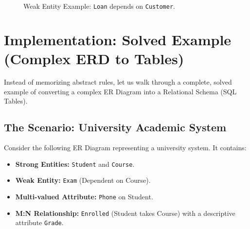 \documentclass[12pt,a4paper]{article}
\begin{document}
\begin{figure}[H]
    \centering
    \caption{Weak Entity Example: \texttt{Loan} depends on \texttt{Customer}.}
\end{figure}



\newpage
\section{Implementation: Solved Example (Complex ERD to Tables)}

Instead of memorizing abstract rules, let us walk through a complete, solved example of converting a complex ER Diagram into a Relational Schema (SQL Tables).

\subsection{The Scenario: University Academic System}
Consider the following ER Diagram representing a university system. It contains:
\begin{itemize}
    \item \textbf{Strong Entities:} \texttt{Student} and \texttt{Course}.
    \item \textbf{Weak Entity:} \texttt{Exam} (Dependent on Course).
    \item \textbf{Multi-valued Attribute:} \texttt{Phone} on Student.
    \item \textbf{M:N Relationship:} \texttt{Enrolled} (Student takes Course) with a descriptive attribute \texttt{Grade}.
\end{itemize}
\end{document}
